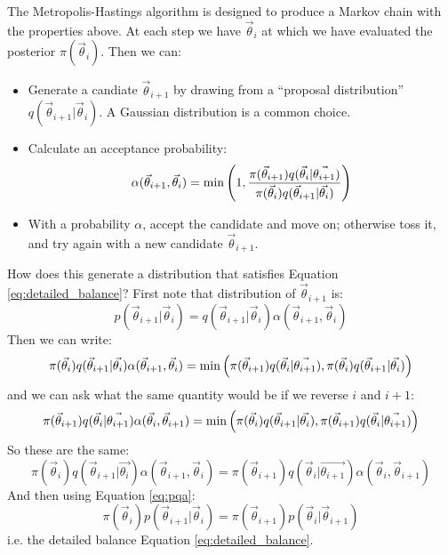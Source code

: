 The Metropolis-Hastings algorithm is designed to produce a Markov
chain with the properties above. At each step we have $\vec{\theta}_i$
at which we have evaluated the posterior $\pi(\vec{\theta}_i)$. Then
we can:
\begin{itemize}
\item Generate a candiate $\vec{\theta}_{i+1}$ by drawing from a
  ``proposal distribution'' $q(\vec{\theta}_{i+1}|\vec{\theta}_i)$. A
  Gaussian distribution is a common choice.
\item Calculate an acceptance probability:
  \begin{equation}
    \alpha(\vec{\theta}_{i+1}, \vec{\theta}_i) = {\rm min}
    \left(1,
    \frac{\pi(\vec{\theta}_{i+1}) q(\vec{\theta}_i| \vec{\theta_{i+1}})}
    {\pi(\vec{\theta}_{i}) q(\vec{\theta}_{i+1}| \vec{\theta_{i}})}
    \right)
  \end{equation} 
\item With a probability $\alpha$, accept the candidate and move on;
  otherwise toss it, and try again with a new candidate
  $\vec{\theta}_{i+1}$.
\end{itemize}

How does this generate a distribution that satisfies Equation
\ref{eq:detailed_balance}? First note that distribution of
$\vec{\theta}_{i+1}$ is:
\begin{equation}
  \label{eq:pqa}
  p(\vec{\theta}_{i+1} | \vec{\theta}_i) =
  q(\vec{\theta}_{i+1}| \vec{\theta}_i)
  \alpha(\vec{\theta}_{i+1}, \vec{\theta}_i)
\end{equation}
Then we can write:
\begin{equation}
    \pi(\vec{\theta}_{i}) q(\vec{\theta}_{i+1}| \vec{\theta_{i}})
    \alpha(\vec{\theta}_{i+1}, \vec{\theta}_i) = {\rm min}
    \left(
    \pi(\vec{\theta}_{i+1}) q(\vec{\theta}_i| \vec{\theta_{i+1}}),
    \pi(\vec{\theta}_{i}) q(\vec{\theta}_{i+1}| \vec{\theta_{i}})
    \right)
\end{equation}
and we can ask what the same quantity would be if we reverse $i$ and
$i+1$:
\begin{equation}
    \pi(\vec{\theta}_{i+1}) q(\vec{\theta}_{i}| \vec{\theta_{i+1}})
    \alpha(\vec{\theta}_{i}, \vec{\theta}_{i+1}) = {\rm min}
    \left(
    \pi(\vec{\theta}_{i}) q(\vec{\theta}_{i+1}| \vec{\theta_{i}}),
    \pi(\vec{\theta}_{i+1}) q(\vec{\theta}_{i}| \vec{\theta_{i+1}})
    \right)
\end{equation}
So these are the same:
\begin{equation}
    \pi(\vec{\theta}_{i}) q(\vec{\theta}_{i+1}| \vec{\theta_{i}})
    \alpha(\vec{\theta}_{i+1}, \vec{\theta}_i) = 
    \pi(\vec{\theta}_{i+1}) q(\vec{\theta}_{i}| \vec{\theta_{i+1}})
    \alpha(\vec{\theta}_{i}, \vec{\theta}_{i+1}) 
\end{equation}
And then using Equation \ref{eq:pqa}:
\begin{equation}
\pi(\vec{\theta}_{i})
p(\vec{\theta}_{i+1} | \vec{\theta}_{i}) = 
\pi(\vec{\theta}_{i+1})
p(\vec{\theta}_{i} | \vec{\theta}_{i+1})
\end{equation}
i.e. the detailed balance Equation \ref{eq:detailed_balance}.

